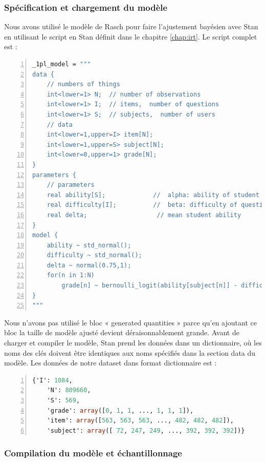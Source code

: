 \subsubsection{Spécification et chargement du modèle}
Nous avons utilisé le modèle de Rasch pour faire l’ajustement bayésien avec Stan en utilisant le script en Stan définit dans le chapitre \ref{chap:irt}. Le script complet est :
\begin{lstlisting}[language=Stan,basicstyle=\scriptsize, frame=l,framesep=4.5mm,framexleftmargin=2.5mm,tabsize=2,numbers=left,fillcolor=\color{blueforest!70},rulecolor=\color{blueforest},numberstyle=\normalfont\tiny\color{white}]
_1pl_model = """
data {
	// numbers of things
	int<lower=1> N;  // number of observations
	int<lower=1> I;  // items,  number of questions  
	int<lower=1> S;  // subjects,  number of users 
	// data
	int<lower=1,upper=I> item[N];
	int<lower=1,upper=S> subject[N];
	int<lower=0,upper=1> grade[N];
}
parameters {
	// parameters
	real ability[S];             //  alpha: ability of student
	real difficulty[I];          //  beta: difficulty of question
	real delta;                   // mean student ability
}
model {
	ability ~ std_normal();         
	difficulty ~ std_normal();   
	delta ~ normal(0.75,1);
	for(n in 1:N)
		grade[n] ~ bernoulli_logit(ability[subject[n]] - difficulty[item[n]] + delta);
}
"""
\end{lstlisting}
Nous n’avons pas utilisé le bloc « generated quantities » parce qu’en ajoutant ce bloc la taille de modèle ajusté devient déraisonnablement grande. Avant de charger et compiler le modèle, Stan prend les données dans un dictionnaire, où les noms des clés doivent être identiques aux noms spécifiés dans la section data du modèle. Les données de notre dataset dans format dictionnaire est :

\begin{lstlisting}[language=Stan,basicstyle=\scriptsize, frame=l,framesep=4.5mm,framexleftmargin=2.5mm,tabsize=2,numbers=left,fillcolor=\color{blueforest!70},rulecolor=\color{blueforest},numberstyle=\normalfont\tiny\color{white}]
	{'I': 1084,
	'N': 809660,
	'S': 569,
	'grade': array([0, 1, 1, ..., 1, 1, 1]),
	'item': array([563, 563, 563, ..., 482, 482, 482]),
	'subject': array([ 72, 247, 249, ..., 392, 392, 392])}
\end{lstlisting}

\subsubsection{Compilation du modèle et échantillonnage }

